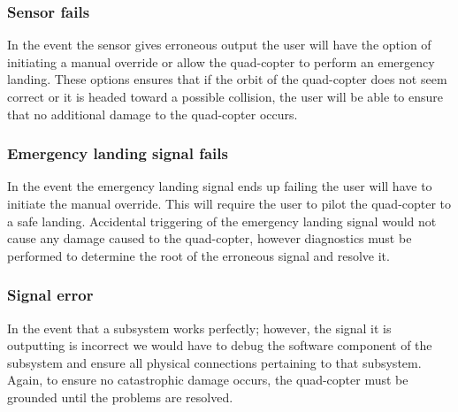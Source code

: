 \documentclass[10pt,letterpaper]{article}
\begin{document}
\subsubsection{Sensor fails}
In the event the sensor gives erroneous output the user will have the option of initiating a manual override or allow the quad-copter to perform an emergency landing. These options ensures that if the orbit of the quad-copter does not seem correct or it is headed toward a possible collision, the user will be able to ensure that no additional damage to the quad-copter occurs.
\subsubsection{Emergency landing signal fails}
In the event the emergency landing signal ends up failing the user will have to initiate the manual override. This will require the user to pilot the quad-copter to a safe landing. Accidental triggering of the emergency landing signal would not cause any damage caused to the quad-copter, however diagnostics must be performed to determine the root of the erroneous signal and resolve it.
\subsubsection{Signal error}
In the event that a subsystem works perfectly; however, the signal it is outputting is incorrect we would have to debug the software component of the subsystem and ensure all physical connections pertaining to that subsystem. Again, to ensure no catastrophic damage occurs, the quad-copter must be grounded until the problems are resolved.
\end{document}
